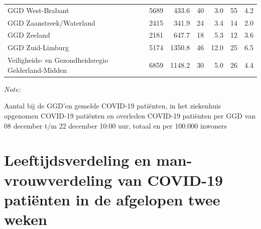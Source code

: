 \documentclass[
  english,
  man,floatsintext]{apa6}
\begin{document}
\begin{table}[H]
\begin{threeparttable}
\begin{tabular}{lrrrrrr}
GGD West-Brabant & 5689 & 433.6 & 40 & 3.0 & 55 & 4.2\\
GGD Zaanstreek/Waterland & 2415 & 341.9 & 24 & 3.4 & 14 & 2.0\\
GGD Zeeland & 2181 & 647.7 & 18 & 5.3 & 12 & 3.6\\
GGD Zuid-Limburg & 5174 & 1350.8 & 46 & 12.0 & 25 & 6.5\\
Veiligheids- en Gezondheidsregio Gelderland-Midden & 6859 & 1148.2 & 30 & 5.0 & 26 & 4.4\\
\bottomrule
\end{tabular}
\begin{tablenotes}
\item \textit{Note: } 
\item Aantal bij de GGD’en gemelde COVID-19 patiënten, in het ziekenhuis opgenomen COVID-19 patiënten en overleden COVID-19 patiënten per GGD van 08 december t/m 22 december 10:00 uur, totaal en per 100.000 inwoners
\end{tablenotes}
\end{threeparttable}
\endgroup{}
\end{table}

\newpage

\hypertarget{leeftijdsverdeling-en-man-vrouwverdeling-van-covid-19-patiuxebnten-in-de-afgelopen-twee-weken}{%
\section{Leeftijdsverdeling en man-vrouwverdeling van COVID-19 patiënten in de afgelopen twee weken}\label{leeftijdsverdeling-en-man-vrouwverdeling-van-covid-19-patiuxebnten-in-de-afgelopen-twee-weken}}
\end{document}

